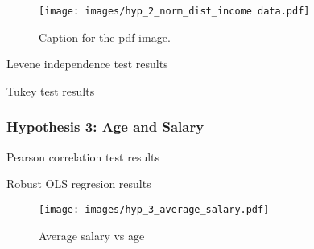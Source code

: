 \begin{figure}[H]
    \centering
    \texttt{[image: images/hyp\_2\_norm\_dist\_income data.pdf]} %
    \caption{Caption for the pdf image.}
    \label{fig:Independence test for anova test}
\end{figure}

\begin{table}[H]
    \centering
    \caption{Levene independence test results}
    \label{tab:Levene test results}
    \begin{minipage}{\columnwidth}
        
    \end{minipage}
\end{table}

\begin{table}[H]
    \centering
    \scriptsize
    \caption{Tukey test results}
    \label{tab:tukey test results}
    \begin{minipage}{\columnwidth}
        \centering
        
    \end{minipage}
\end{table}

\subsubsection{Hypothesis 3: Age and Salary}

\begin{table}[H]
    \centering
    \caption{Pearson correlation test results}
    \label{tab:pearson correlation test results}
    \begin{minipage}{\columnwidth}
        
    \end{minipage}
\end{table}

\begin{table}[H]
    \centering
    \scriptsize
    \caption{Robust OLS regresion results}
    \label{tab:robust ols regression test results}
    \begin{minipage}{\columnwidth}
        \centering
        
    \end{minipage}
\end{table}

\begin{figure}[H]
    \centering
    \texttt{[image: images/hyp\_3\_average\_salary.pdf]} %
    \caption{Average salary vs age}
    \label{fig:Average salary by age scatter plot}
\end{figure}

